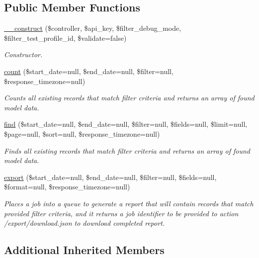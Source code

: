 \subsection*{Public Member Functions}
\begin{DoxyCompactItemize}
\item 
\hyperlink{classTune_1_1Management_1_1Reports_1_1ReportsLogsBase_a3d58a46a627c98e3012fac2bc939b031}{\-\_\-\-\_\-construct} (\$controller, \$api\-\_\-key, \$filter\-\_\-debug\-\_\-mode, \$filter\-\_\-test\-\_\-profile\-\_\-id, \$validate=false)
\begin{DoxyCompactList}\small\item\em Constructor. \end{DoxyCompactList}\item 
\hyperlink{classTune_1_1Management_1_1Reports_1_1ReportsLogsBase_acf730a817b29c628027ffa2224043a5e}{count} (\$start\-\_\-date=null, \$end\-\_\-date=null, \$filter=null, \$response\-\_\-timezone=null)
\begin{DoxyCompactList}\small\item\em Counts all existing records that match filter criteria and returns an array of found model data. \end{DoxyCompactList}\item 
\hyperlink{classTune_1_1Management_1_1Reports_1_1ReportsLogsBase_aa9efe4c209d9869a8da68f19a265dfb8}{find} (\$start\-\_\-date=null, \$end\-\_\-date=null, \$filter=null, \$fields=null, \$limit=null, \$page=null, \$sort=null, \$response\-\_\-timezone=null)
\begin{DoxyCompactList}\small\item\em Finds all existing records that match filter criteria and returns an array of found model data. \end{DoxyCompactList}\item 
\hyperlink{classTune_1_1Management_1_1Reports_1_1ReportsLogsBase_a1ca46f6eeec28945414c09249e8ea6f5}{export} (\$start\-\_\-date=null, \$end\-\_\-date=null, \$filter=null, \$fields=null, \$format=null, \$response\-\_\-timezone=null)
\begin{DoxyCompactList}\small\item\em Places a job into a queue to generate a report that will contain records that match provided filter criteria, and it returns a job identifier to be provided to action /export/download.json to download completed report. \end{DoxyCompactList}\end{DoxyCompactItemize}
\subsection*{Additional Inherited Members}


